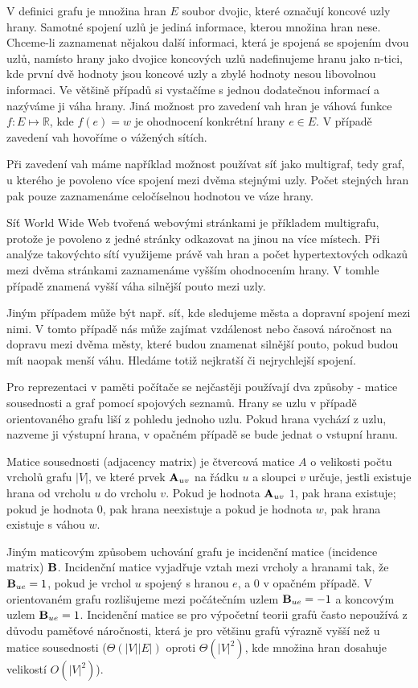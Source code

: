 \documentclass{bakalarka}
\begin{document}
V definici grafu je množina hran $E$ soubor dvojic, které označují koncové uzly
hrany. Samotné spojení uzlů je jediná informace, kterou množina hran nese.
Chceme-li zaznamenat nějakou další informaci, která je spojená se spojením dvou
uzlů, namísto hrany jako dvojice koncových uzlů nadefinujeme hranu jako n-tici,
kde první dvě hodnoty jsou koncové uzly a zbylé hodnoty nesou libovolnou
informaci.  Ve většině případů si vystačíme s jednou dodatečnou informací a
nazýváme ji váha hrany. Jiná možnost pro zavedení vah hran je váhová funkce $f:
E \mapsto \mathbb{R}$, kde $f(e) = w$ je ohodnocení konkrétní hrany $e \in E$.
V případě zavedení vah hovoříme o vážených sítích.

Při zavedení vah máme například možnost používat síť jako multigraf, tedy graf,
u kterého je povoleno více spojení mezi dvěma stejnými uzly. Počet stejných
hran pak pouze zaznamenáme celočíselnou hodnotou ve váze hrany.

Síť World Wide Web tvořená webovými stránkami je příkladem
multigrafu, protože je povoleno z jedné stránky odkazovat na jinou na více
místech. Při analýze takovýchto sítí využijeme právě vah hran a počet
hypertextových odkazů mezi dvěma stránkami zaznamenáme vyšším ohodnocením
hrany. V tomhle případě znamená vyšší váha silnější pouto mezi uzly.

Jiným případem může být např. síť, kde sledujeme města a dopravní spojení
mezi nimi. V tomto případě nás může zajímat vzdálenost nebo časová náročnost
na dopravu mezi dvěma městy, které budou znamenat silnější pouto, pokud budou
mít naopak menší váhu. Hledáme totiž nejkratší či nejrychlejší spojení.


Pro reprezentaci v paměti počítače se nejčastěji používají dva způsoby - matice
sousednosti a graf pomocí spojových seznamů. Hrany se uzlu v případě
orientovaného grafu liší z pohledu jednoho uzlu. Pokud hrana vychází z uzlu,
nazveme ji výstupní hrana, v opačném případě se bude jednat o vstupní hranu.


Matice sousednosti (adjacency matrix) je čtvercová matice $A$ o velikosti počtu
vrcholů grafu $|V|$, ve které prvek ${\bf A}_{uv}$ na řádku $u$ a sloupci $v$
určuje, jestli existuje hrana od vrcholu $u$ do vrcholu $v$. Pokud je hodnota
${\bf A}_{uv}$ $1$, pak hrana existuje; pokud je hodnota $0$, pak hrana
neexistuje a pokud je hodnota $w$, pak hrana existuje s váhou $w$.

Jiným maticovým způsobem uchování grafu je incidenční matice (incidence matrix)
${\bf B}$.  Incidenční matice vyjadřuje vztah mezi vrcholy a hranami tak, že
${\bf B}_{ue} = 1$, pokud je vrchol $u$ spojený s hranou $e$, a $0$ v opačném
případě. V orientovaném grafu rozlišujeme mezi počátečním uzlem ${\bf B}_{ue} =
-1$ a koncovým uzlem ${\bf B}_{ue} = 1$. Incidenční matice se pro výpočetní
teorii grafů často nepoužívá z důvodu paměťové náročnosti, která je pro většinu
grafů výrazně vyšší než u matice sousednosti ($\Theta(|V||E|)$ oproti
$\Theta(|V|^2)$, kde množina hran dosahuje velikostí $O(|V|^2)$).
\end{document}
